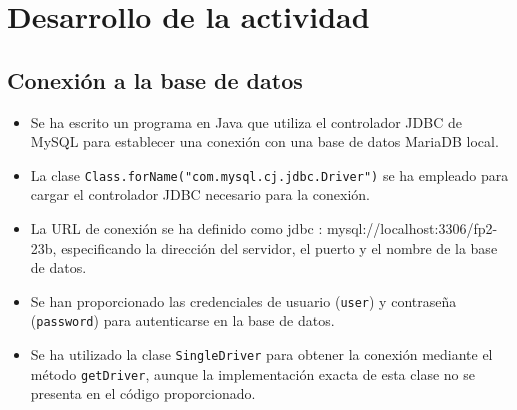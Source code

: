 \documentclass{article}
\begin{document}
  \section{Desarrollo de la actividad}


  \subsection{Conexión a la base de datos}
  \begin{itemize}
    \item Se ha escrito un programa en Java que utiliza el controlador JDBC de MySQL para establecer una conexión con una base de datos MariaDB local.
    \item La clase \texttt{Class.forName("com.mysql.cj.jdbc.Driver")} se ha empleado para cargar el controlador JDBC necesario para la conexión.
    \item La URL de conexión se ha definido como jdbc : mysql://localhost:3306/fp2-23b, especificando la dirección del servidor, el puerto y el nombre de la base de datos.
    \item Se han proporcionado las credenciales de usuario (\texttt{user}) y contraseña (\texttt{password}) para autenticarse en la base de datos.
    \item Se ha utilizado la clase \texttt{SingleDriver} para obtener la conexión mediante el método \texttt{getDriver}, aunque la implementación exacta de esta clase no se presenta en el código proporcionado.
  \end{itemize}
\end{document}
